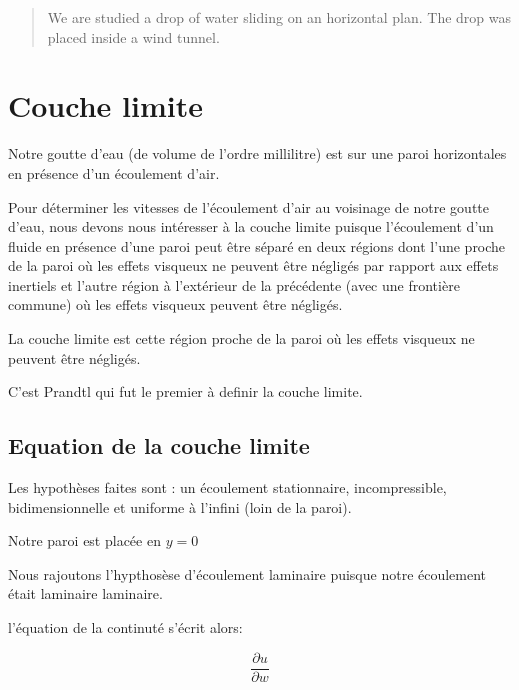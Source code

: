 \documentclass[french]{article}
\begin{document}
 
\tableofcontents
 
\vspace{2cm} %
 
\begin{abstract}
We are studied a drop of water sliding on an horizontal plan. The drop was placed inside a wind tunnel.
\end{abstract}

\section{Couche limite}
Notre goutte d'eau (de volume de l'ordre millilitre) est sur une paroi horizontales en présence d'un écoulement d'air.


Pour déterminer les vitesses de l'écoulement d'air au voisinage de notre goutte d'eau, nous devons nous intéresser à la couche limite puisque l'écoulement d'un fluide en présence d'une paroi peut être séparé en deux régions dont l'une proche de la paroi où les effets visqueux ne peuvent être négligés par rapport aux effets inertiels et l'autre région à l'extérieur de la précédente (avec une frontière commune) où les effets visqueux peuvent être négligés.

La couche limite est cette région proche de la paroi où les effets visqueux ne peuvent être négligés.

C'est Prandtl qui fut le premier à definir la couche limite. 

\subsection{Equation de la couche limite }
Les hypothèses faites sont : un écoulement stationnaire, incompressible, bidimensionnelle et uniforme à l'infini (loin de la paroi).

Notre paroi est placée en $y = 0$

Nous rajoutons l'hypthosèse d'écoulement laminaire puisque notre écoulement était laminaire laminaire.

l'équation de la continuté s'écrit alors:

\begin{equation}
\frac{\partial u}{\partial w}
\end{equation}
\end{document}
